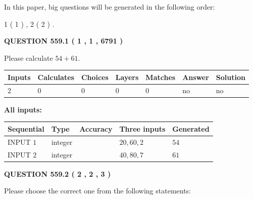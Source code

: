 \documentclass[12pt]{article}
\begin{document}
\vspace{0.2in}
   
In this paper, big questions will be generated in the following order: 
   
   
   1 ( 1 )
 ,
   2 ( 2 )
 .
  
\vspace{0.2in}
  
{\textbf{\Large{QUESTION
559.1 
 ( 1 , 1 , 6791 )
}}}
  
  
 
Please calculate $ %
54 +  %
61 $.
 
 
   
   
   
   
\noindent\begin{tabular}{|l|l|l|l|l|l|l|}
 \hline
Inputs & Calculates & Choices & Layers & Matches & Answer & Solution \\ \hline
 2  & 
 0  & 
 0
  & 
 0  & 
 0  & 
  no & 
  no 
  \\ \hline
 \end{tabular}
   
   
   
   
\noindent{}
   
   
   
   
\noindent\vspace{0.1in}\hspace{-0.08in} {\textbf{\Large{All inputs: }}}
   
   
  
  
\noindent\begin{tabular}{|l|l|l|l|l|}
\hline
 Sequential & Type & Accuracy & Three inputs & Generated \\ 
\hline
 
 
  INPUT $  1 $ & integer &  & $
 20
 , 
 60
 , 
 2
 $ & $ 54 $ 
 \\  \hline  
 
 
  INPUT $  2 $ & integer &  & $
 40
 , 
 80
 , 
 7
 $ & $ 61 $ 
 \\  \hline  
 \end{tabular}
   
   
  
\vspace{0.2in}
  
{\textbf{\Large{QUESTION
559.2 
 ( 2 , 2 , 3 )
}}}
  
  
Please choose the correct one from the following statements:
 
\end{document}
